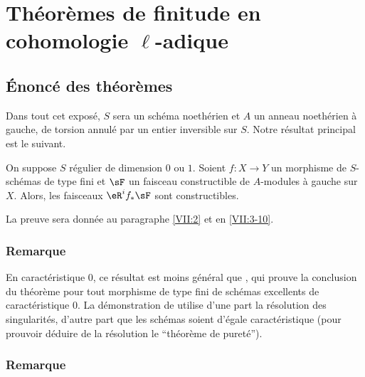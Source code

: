 

\chapter{Théorèmes de finitude en cohomologie \texorpdfstring{$\ell$}{l}-adique}\label{VII}










\section{Énoncé des théorèmes}\label{VII:1}

Dans tout cet expos\'e, $S$ sera un sch\'ema noeth\'erien et $A$ un anneau 
noeth\'erien \`a gauche, de torsion annul\'e par un entier inversible sur $S$. 
Notre r\'esultat principal est le suivant. 





\begin{theorem_}\label{VII:1-1}
On suppose $S$ r\'egulier de dimension $0$ ou $1$. Soient $f:X\to Y$ un 
morphisme de $S$-sch\'emas de type fini et $\sF$ un faisceau constructible de 
$A$-modules \`a gauche sur $X$. Alors, les faisceaux $\eR^i f_\ast \sF$ sont 
constructibles. 
\end{theorem_}

La preuve sera donn\'ee au paragraphe \ref{VII:2} et en \ref{VII:3-10}. 





\subsection{Remarque}\label{VIII:1-2}

En caract\'eristique $0$, ce r\'esultat est moins g\'en\'eral que 
\cite[XIX paragraphe 5]{sga4}, qui prouve la conclusion du th\'eor\`eme pour 
tout morphisme de type fini de sch\'emas excellents de caract\'eristique $0$. 
La d\'emonstration de \cite[XIX]{sga4} utilise d'une part la r\'esolution des  
singularit\'es, d'autre part que les sch\'emas soient d'\'egale 
caract\'eristique (pour prouvoir d\'eduire de la r\'esolution le ``th\'eor\`eme 
de pureté''). 






\subsection{Remarque}\label{VII:1-3}

